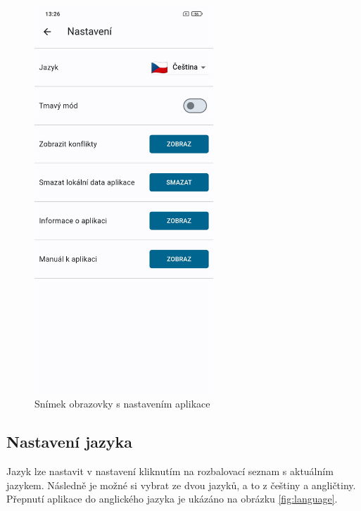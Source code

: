 \documentclass[czech, bc, kiv, he, iso690numb]{fasthesis}
\begin{document}
\begin{figure}[h!]
  \centering
  \includegraphics[width=0.6\textwidth]{img/BP-Runt/UserManual/Settings.jpg}
  \caption{Snímek obrazovky s nastavením aplikace}
  \label{fig:SettinsPage}
\end{figure}

\subsection{Nastavení jazyka}

Jazyk lze nastavit v nastavení kliknutím na rozbalovací seznam s aktuálním jazykem. Následně je možné si vybrat ze dvou jazyků, a to z češtiny a angličtiny. Přepnutí aplikace do anglického jazyka je ukázáno na obrázku \ref{fig:language}.
\end{document}
